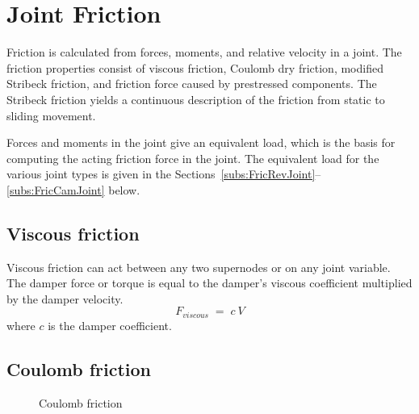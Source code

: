 %
%

%
%

\section{Joint Friction}

Friction is calculated from forces, moments, and relative velocity in a joint.
The friction properties consist of viscous friction, Coulomb dry friction,
modified Stribeck friction, and friction force caused by prestressed components.
The Stribeck friction yields a continuous description of the friction from
static to sliding movement.

Forces and moments in the joint give an equivalent load, which is the basis for
computing the acting friction force in the joint.
The equivalent load for the various joint types is given in the
Sections~\ref{subs:FricRevJoint}--\ref{subs:FricCamJoint} below.


\subsection{Viscous friction}

Viscous friction can act between any two supernodes or on any joint variable.
The damper force or torque is equal to the damper's viscous coefficient
multiplied by the damper velocity.
%
\begin{equation}
F_{\textit{viscous}} \;=\; c\: V
\end{equation}
%
where $c$ is the damper coefficient.


\subsection{Coulomb friction}

\begin{figure}[b]
\caption{Coulomb friction}
\label{figFRIC:Coulomb}
\end{figure}

